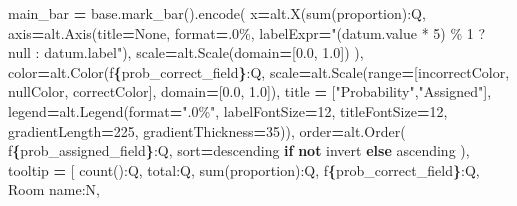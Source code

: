 \documentclass[
]{article}
\newenvironment{Shaded}{\begin{snugshade}}{\end{snugshade}}
\newcommand{\BuiltInTok}[1]{#1}
\newcommand{\ControlFlowTok}[1]{\textcolor[rgb]{0.13,0.29,0.53}{\textbf{#1}}}
\newcommand{\DecValTok}[1]{\textcolor[rgb]{0.00,0.00,0.81}{#1}}
\newcommand{\FloatTok}[1]{\textcolor[rgb]{0.00,0.00,0.81}{#1}}
\newcommand{\KeywordTok}[1]{\textcolor[rgb]{0.13,0.29,0.53}{\textbf{#1}}}
\newcommand{\NormalTok}[1]{#1}
\newcommand{\OperatorTok}[1]{\textcolor[rgb]{0.81,0.36,0.00}{\textbf{#1}}}
\newcommand{\SpecialCharTok}[1]{\textcolor[rgb]{0.81,0.36,0.00}{\textbf{#1}}}
\newcommand{\SpecialStringTok}[1]{\textcolor[rgb]{0.31,0.60,0.02}{#1}}
\newcommand{\StringTok}[1]{\textcolor[rgb]{0.31,0.60,0.02}{#1}}
\newcommand{\VariableTok}[1]{\textcolor[rgb]{0.00,0.00,0.00}{#1}}
\begin{document}
\begin{Shaded}
\begin{Highlighting}[]
\NormalTok{    main\_bar }\OperatorTok{=}\NormalTok{ base.mark\_bar().encode(}
\NormalTok{        x}\OperatorTok{=}\NormalTok{alt.X(}\StringTok{\textquotesingle{}sum(proportion):Q\textquotesingle{}}\NormalTok{,}
\NormalTok{            axis}\OperatorTok{=}\NormalTok{alt.Axis(title}\OperatorTok{=}\VariableTok{None}\NormalTok{, }\BuiltInTok{format}\OperatorTok{=}\StringTok{\textquotesingle{}.0\%\textquotesingle{}}\NormalTok{, labelExpr}\OperatorTok{=}\StringTok{"(datum.value * 5) \% 1 ? null : datum.label"}\NormalTok{),}
\NormalTok{            scale}\OperatorTok{=}\NormalTok{alt.Scale(domain}\OperatorTok{=}\NormalTok{[}\FloatTok{0.0}\NormalTok{, }\FloatTok{1.0}\NormalTok{])}
\NormalTok{        ),}
\NormalTok{        color}\OperatorTok{=}\NormalTok{alt.Color(}\SpecialStringTok{f\textquotesingle{}}\SpecialCharTok{\{}\NormalTok{prob\_correct\_field}\SpecialCharTok{\}}\SpecialStringTok{:Q\textquotesingle{}}\NormalTok{, scale}\OperatorTok{=}\NormalTok{alt.Scale(}\BuiltInTok{range}\OperatorTok{=}\NormalTok{[incorrectColor, nullColor, correctColor], domain}\OperatorTok{=}\NormalTok{[}\FloatTok{0.0}\NormalTok{, }\FloatTok{1.0}\NormalTok{]), title }\OperatorTok{=}\NormalTok{ [}\StringTok{"Probability"}\NormalTok{,}\StringTok{"Assigned"}\NormalTok{], legend}\OperatorTok{=}\NormalTok{alt.Legend(}\BuiltInTok{format}\OperatorTok{=}\StringTok{".0\%"}\NormalTok{, labelFontSize}\OperatorTok{=}\DecValTok{12}\NormalTok{, titleFontSize}\OperatorTok{=}\DecValTok{12}\NormalTok{, gradientLength}\OperatorTok{=}\DecValTok{225}\NormalTok{, gradientThickness}\OperatorTok{=}\DecValTok{35}\NormalTok{)),}
\NormalTok{        order}\OperatorTok{=}\NormalTok{alt.Order(}
            \SpecialStringTok{f\textquotesingle{}}\SpecialCharTok{\{}\NormalTok{prob\_assigned\_field}\SpecialCharTok{\}}\SpecialStringTok{:Q\textquotesingle{}}\NormalTok{,}
\NormalTok{            sort}\OperatorTok{=}\StringTok{\textquotesingle{}descending\textquotesingle{}} \ControlFlowTok{if} \KeywordTok{not}\NormalTok{ invert }\ControlFlowTok{else} \StringTok{\textquotesingle{}ascending\textquotesingle{}}
\NormalTok{        ),}
\NormalTok{        tooltip }\OperatorTok{=}\NormalTok{ [}
            \StringTok{\textquotesingle{}count():Q\textquotesingle{}}\NormalTok{,}
            \StringTok{\textquotesingle{}total:Q\textquotesingle{}}\NormalTok{,}
            \StringTok{\textquotesingle{}sum(proportion):Q\textquotesingle{}}\NormalTok{,}
            \SpecialStringTok{f\textquotesingle{}}\SpecialCharTok{\{}\NormalTok{prob\_correct\_field}\SpecialCharTok{\}}\SpecialStringTok{:Q\textquotesingle{}}\NormalTok{,}
            \StringTok{\textquotesingle{}Room name:N\textquotesingle{}}\NormalTok{,}

\end{Highlighting}
\end{Shaded}
\end{document}

